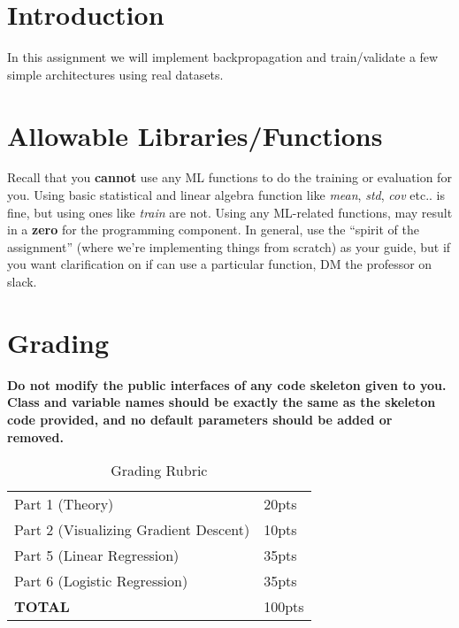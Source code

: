 \documentclass[12pt]{article}
\begin{document}
\maketitle


\section*{Introduction}
In this assignment we will implement backpropagation and train/validate a few simple architectures using real datasets.\\

\section*{Allowable Libraries/Functions}
Recall that you \textbf{cannot} use any ML functions to do the training or evaluation for you.  Using basic statistical and linear algebra function like \emph{mean}, \emph{std}, \emph{cov} etc.. is fine, but using ones like \emph{train} are not. Using any ML-related functions, may result in a \textbf{zero} for the programming component.  In general, use the ``spirit of the assignment'' (where we're implementing things from scratch) as your guide, but if you want clarification on if can use a particular function, DM the professor on slack.



\section*{Grading}
\textbf{Do not modify the public interfaces of any code skeleton given to you. Class and variable names should be exactly the same as the skeleton code provided, and no default parameters should be added or removed.}
\begin{table}[h]
\begin{center}
\begin{tabular}{|l|l|}
\hline
Part 1 (Theory) & 20pts\\
Part 2 (Visualizing Gradient Descent) & 10pts\\
Part 5 (Linear Regression) & 35pts\\
Part 6 (Logistic Regression) & 35pts\\
\hline
\textbf{TOTAL} & 100pts \\
\hline
\end{tabular}
\caption{Grading Rubric}
\end{center}
\end{table}
\end{document}
